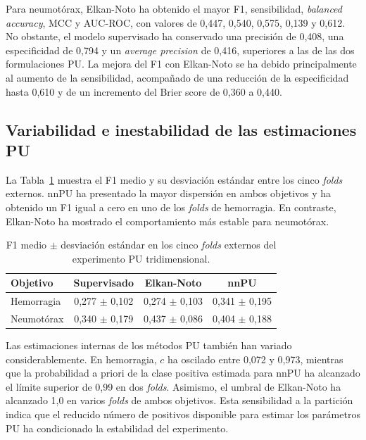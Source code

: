 Para neumotórax, Elkan-Noto ha obtenido el mayor F1, sensibilidad, \textit{balanced accuracy}, MCC y AUC-ROC, con valores de 0,447, 0,540, 0,575, 0,139 y 0,612. No obstante, el modelo supervisado ha conservado una precisión de 0,408, una especificidad de 0,794 y un \textit{average precision} de 0,416, superiores a las de las dos formulaciones PU. La mejora del F1 con Elkan-Noto se ha debido principalmente al aumento de la sensibilidad, acompañado de una reducción de la especificidad hasta 0,610 y de un incremento del Brier score de 0,360 a 0,440.

\subsection{Variabilidad e inestabilidad de las estimaciones PU}

La Tabla~\ref{tab:pu3d_f1_folds} muestra el F1 medio y su desviación estándar entre los cinco \textit{folds} externos. nnPU ha presentado la mayor dispersión en ambos objetivos y ha obtenido un F1 igual a cero en uno de los \textit{folds} de hemorragia. En contraste, Elkan-Noto ha mostrado el comportamiento más estable para neumotórax.

\begin{table}[!htbp]
\centering
\caption{F1 medio $\pm$ desviación estándar en los cinco \textit{folds} externos del experimento PU tridimensional.}
\label{tab:pu3d_f1_folds}
\small
\begin{tabular}{lccc}
\toprule
\textbf{Objetivo} & \textbf{Supervisado} & \textbf{Elkan-Noto} & \textbf{nnPU} \\
\midrule
Hemorragia & 0,277 $\pm$ 0,102 & 0,274 $\pm$ 0,103 & 0,341 $\pm$ 0,195 \\
Neumotórax & 0,340 $\pm$ 0,179 & 0,437 $\pm$ 0,086 & 0,404 $\pm$ 0,188 \\
\bottomrule
\end{tabular}
\end{table}

Las estimaciones internas de los métodos PU también han variado considerablemente. En hemorragia, \(c\) ha oscilado entre 0,072 y 0,973, mientras que la probabilidad a priori de la clase positiva estimada para nnPU ha alcanzado el límite superior de 0,99 en dos \textit{folds}. Asimismo, el umbral de Elkan-Noto ha alcanzado 1,0 en varios \textit{folds} de ambos objetivos. Esta sensibilidad a la partición indica que el reducido número de positivos disponible para estimar los parámetros PU ha condicionado la estabilidad del experimento.

